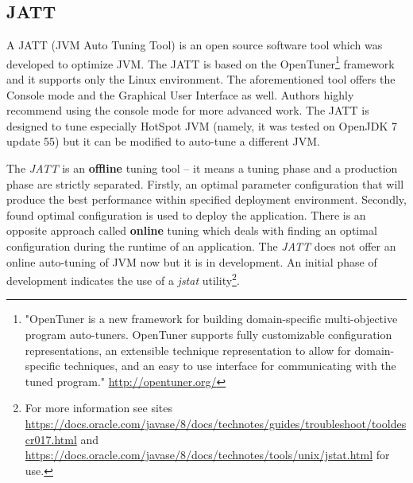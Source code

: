 \documentclass[
  digital, %
  oneside,
  notable, %
  nolof,     %
  nolot     %
]{fithesis3}
\begin{document}
\subsection{JATT}\label{jatt}
A JATT (JVM Auto Tuning Tool) is an open source software tool which was developed to optimize JVM. The JATT is based on the OpenTuner\footnote{"OpenTuner is a new framework for building domain-specific multi-objective program auto-tuners. OpenTuner supports fully customizable configuration representations, an extensible technique representation to allow for domain-specific techniques, and an easy to use interface for communicating with the tuned program." \url{http://opentuner.org/}} framework and it supports only the Linux environment. The aforementioned tool offers the Console mode and the Graphical User Interface as well. Authors highly recommend using the console mode for more advanced work. The JATT is designed to tune especially HotSpot JVM (namely, it was tested on OpenJDK 7 update 55) but it can be modified to auto-tune a different JVM.
\cite{jatt-web} \cite{jatt-web-dzone}

The \textit{JATT} is an \textbf{offline} tuning tool -- it means a tuning phase and a production phase are strictly separated. Firstly, an optimal parameter configuration that will produce the best performance within specified deployment environment. Secondly, found optimal configuration is used to deploy the application. There is an opposite approach called \textbf{online} tuning which deals with finding an optimal configuration during the runtime of an application. The \textit{JATT} does not offer an online auto-tuning of JVM now but it is in development. 
An initial phase of development indicates the use of a \textit{jstat} utility\footnote{For more information see sites \url{https://docs.oracle.com/javase/8/docs/technotes/guides/troubleshoot/tooldescr017.html} and \url{https://docs.oracle.com/javase/8/docs/technotes/tools/unix/jstat.html} for use.}. \cite{jatt}
\end{document}
